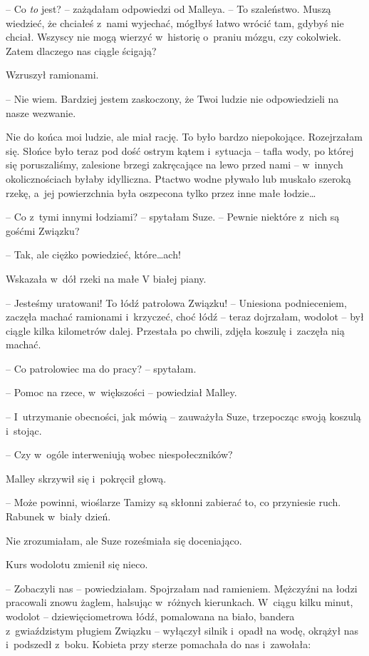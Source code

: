\documentclass[oneside,polish,11pt,sfheadings]{mwbk}
\begin{document}
-- Co \textit{to} jest? -- zażądałam odpowiedzi od Malleya. -- To szaleństwo.
Muszą wiedzieć, że chciałeś z~nami wyjechać, mógłbyś łatwo wrócić tam,
gdybyś nie chciał. Wszyscy nie mogą wierzyć w~historię o~praniu mózgu,
czy cokolwiek. Zatem dlaczego nas ciągle ścigają?

Wzruszył ramionami. 

-- Nie wiem. Bardziej jestem zaskoczony, że Twoi
ludzie nie odpowiedzieli na nasze wezwanie.

Nie do końca moi ludzie, ale miał rację. To było bardzo niepokojące.
Rozejrzałam się. Słońce było teraz pod dość ostrym kątem i~sytuacja -- tafla wody, po której się poruszaliśmy, zalesione brzegi zakręcające na
lewo przed nami -- w~innych okolicznościach byłaby idylliczna. Ptactwo
wodne pływało lub muskało szeroką rzekę, a~jej powierzchnia była
oszpecona tylko przez inne małe łodzie\ldots 

-- Co z~tymi innymi łodziami? -- spytałam Suze. -- Pewnie niektóre z~nich
są gośćmi Związku?

-- Tak, ale ciężko powiedzieć, które\ldots  ach!

Wskazała w~dół rzeki na małe V białej piany. 

-- Jesteśmy uratowani! To
łódź patrolowa Związku! -- Uniesiona podnieceniem, zaczęła machać
ramionami i~krzyczeć, choć łódź -- teraz dojrzałam, wodolot -- był ciągle
kilka kilometrów dalej. Przestała po chwili, zdjęła koszulę i~zaczęła
nią machać.

-- Co patrolowiec ma do pracy? -- spytałam.

-- Pomoc na rzece, w~większości -- powiedział Malley.

-- I~utrzymanie obecności, jak mówią -- zauważyła Suze, trzepocząc swoją
koszulą i~stojąc.

-- Czy w~ogóle interweniują wobec niespołeczników?

Malley skrzywił się i~pokręcił głową. 

-- Może powinni, wioślarze Tamizy
są skłonni zabierać to, co przyniesie ruch. Rabunek w~biały dzień.

Nie zrozumiałam, ale Suze roześmiała się doceniająco.

Kurs wodolotu zmienił się nieco. 

-- Zobaczyli nas -- powiedziałam.
Spojrzałam nad ramieniem. Mężczyźni na łodzi pracowali znowu żaglem,
halsując w~różnych kierunkach. W~ciągu kilku minut, wodolot -- dziewięciometrowa łódź, pomalowana na biało, bandera z~gwiaździstym
pługiem Związku -- wyłączył silnik i~opadł na wodę, okrążył nas i~podszedł z~boku. Kobieta przy sterze pomachała do nas i~zawołała: 
\end{document}
